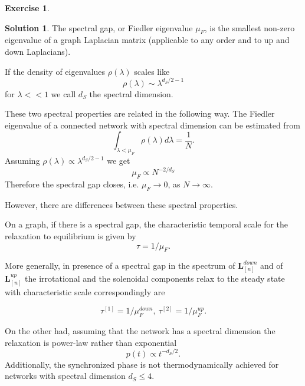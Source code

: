 \documentclass{article}
\theoremstyle{plain}
\theoremstyle{definition}
\newtheorem{exercise}{Exercise}
\newtheorem*{sol*}{Solution}
\begin{document}
\begin{exercise}
\end{exercise}
\begin{sol*}
The spectral gap, or Fiedler eigenvalue $\mu_F$, is the smallest non-zero eigenvalue of a graph Laplacian matrix (applicable to any order and to up and down Laplacians). 

If the density of eigenvalues $\rho(\lambda)$ scales like
\[
\rho(\lambda)\sim \lambda^{d_S/2 -1 }
\]
for $\lambda <<1$ we call $d_S$ the spectral dimension.

These two spectral properties are related in the following way. The Fiedler eigenvalue of a connected network with spectral dimension
can be estimated from
\[
\int_{\lambda<\mu_F}
\rho(\lambda)d\lambda = \frac{1}{N}.
\]
Assuming $\rho(\lambda) \propto \lambda^{d_S/2 - 1}$ we get
\[
\mu_F \propto N^{-2/d_S}
\]
Therefore the spectral gap closes, i.e. $\mu_F\to 0$, as $N \to \infty$. 

However, there are differences between these spectral properties.





On a graph, if there is a spectral gap,
the characteristic temporal scale for the relaxation
to equilibrium is given by 
\[\tau = 1/\mu_F.\]

More generally, in presence of a spectral gap
in the spectrum of $\mathbf{L}^{down}_{[n]}$ and of $\mathbf{L}^{up}_{[n]}$
the irrotational and the solenoidal components
relax to the steady state with characteristic scale
correspondingly are

\[\tau^{[1]} = 1/\mu^{down}_F ,\ \tau^{[2]} = 1/\mu^{up}_F.\] 


On the other had, assuming that the network has a spectral
dimension the relaxation is power-law
rather than exponential
\[
p(t) \propto t^{-d_S/2}.
\]
Additionally, the synchronized phase is not
thermodynamically achieved
for networks with spectral dimension $d_S\leq 4$.


\end{sol*}
\end{document}
